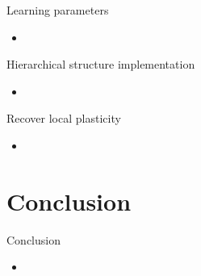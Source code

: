 \documentclass[aspectratio=43]{beamer}
\begin{document}
\begin{frame}{Learning parameters}
  \begin{itemize}
    \item %
  \end{itemize}
\end{frame}

\begin{frame}{Hierarchical structure implementation}
  \begin{itemize}
    \item %
  \end{itemize}
\end{frame}

\begin{frame}{Recover local plasticity}
  \begin{itemize}
    \item %
  \end{itemize}
\end{frame}




\section{Conclusion}
\begin{frame}{Conclusion}
  \begin{itemize}
    \item %
  \end{itemize}
\end{frame}
\end{document}
